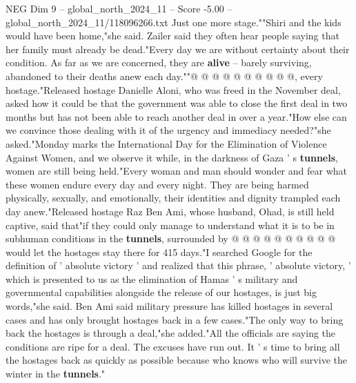 \begin{textsample}{NEG Dim 9 – global\_north\_2024\_11 – Score -5.00 – global\_north\_2024\_11/118096266.txt}
Just one more stage.""Shiri and the kids would have been home,"she said.
Zailer said they often hear people saying that her family must already be dead."Every day we are without certainty about their condition.
As far as we are concerned, they are \textbf{alive} -- barely surviving, abandoned to their deaths anew each day.""@ @ @ @ @ @ @ @ @ @, every hostage."Released hostage Danielle Aloni, who was freed in the November deal, asked how it could be that the government was able to close the first deal in two months but has not been able to reach another deal in over a year."How else can we convince those dealing with it of the urgency and immediacy needed?"she asked."Monday marks the International Day for the Elimination of Violence Against Women, and we observe it while, in the darkness of Gaza ' s \textbf{tunnels}, women are still being held."Every woman and man should wonder and fear what these women endure every day and every night.
They are being harmed physically, sexually, and emotionally, their identities and dignity trampled each day anew."Released hostage Raz Ben Ami, whose husband, Ohad, is still held captive, said that"if they could only manage to understand what it is to be in subhuman conditions in the \textbf{tunnels}, surrounded by @ @ @ @ @ @ @ @ @ @ would let the hostages stay there for 415 days."I searched Google for the definition of ' absolute victory ' and realized that this phrase, ' absolute victory, ' which is presented to us as the elimination of Hamas ' s military and governmental capabilities alongside the release of our hostages, is just big words,"she said.
Ben Ami said military pressure has killed hostages in several cases and has only brought hostages back in a few cases."The only way to bring back the hostages is through a deal,"she added."All the officials are saying the conditions are ripe for a deal.
The excuses have run out.
It ' s time to bring all the hostages back as quickly as possible because who knows who will survive the winter in the \textbf{tunnels}."

\end{textsample}
